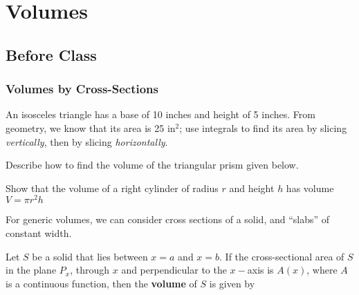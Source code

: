 \documentclass[notes]{subfiles}
\begin{document}
	\fancyhead[LO,RE]{\bfseries \currentname}
	\fancyfoot[C]{{}}
	\fancyfoot[RO,LE]{\large \thepage}	%
	
\section*{Volumes}\label{cs52}
	\subsection*{Before Class}
	\subsubsection*{Volumes by Cross-Sections}
		\begin{ex}
			An isosceles triangle has a base of 10 inches and height of 5 inches.  From geometry, we know that its area is 25 in$^2$; use integrals to find its area by slicing \emph{vertically}, then by slicing \emph{horizontally}.
		\end{ex}
		
		\begin{ex} 
		Describe how to find the volume of the triangular prism given below.  \\[5pt]
		\end{ex}
			\vs{.25}
			\newpage
			
		\begin{ex}
			Show that the volume of a right cylinder of radius $r$ and height $h$ has volume $V = \pi r^2h$
		\end{ex}
		
		For generic volumes, we can consider cross sections of a solid, and ``slabs'' of constant width.
		\begin{defn}[Volume]
			Let $S$ be a solid that lies between $x =a $ and $x = b$.  If the cross-sectional area of $S$ in the plane $P_x$, through $x$ and perpendicular to the $x-$axis is $A(x)$, where $A$ is a continuous function, then the \textbf{volume} of $S$ is given by
		\end{defn}
		
\end{document}
